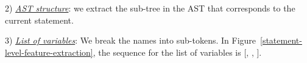 2) {\em \underline{AST structure}}: we extract the sub-tree in the AST that
corresponds to the current statement.

3) {\em \underline{List of variables}}:
We break the names into sub-tokens. In
Figure~\ref{statement-level-feature-extraction}, the sequence for the
list of variables is [, , ].







